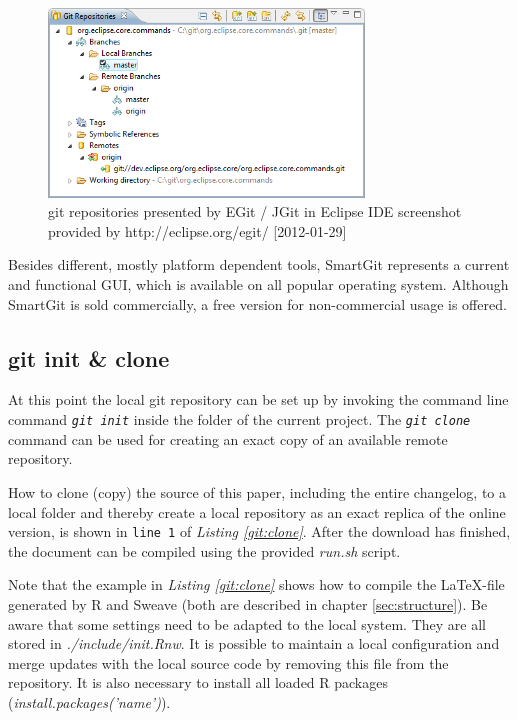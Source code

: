 \documentclass{ifacconf}
\begin{document}
\begin{figure}[h]
\begin{center}
\includegraphics[width=8.4cm]{pics/EGit.png}    %
\caption{git repositories presented by EGit / JGit in Eclipse IDE \newline 
screenshot provided by http://eclipse.org/egit/ [2012-01-29]} 
\label{fig:JGit}
\end{center}
\end{figure}

Besides different, mostly platform dependent tools, 
SmartGit represents a current and functional GUI, which
is available on all popular operating system. Although SmartGit is sold commercially,
a free version for non-commercial usage is offered.




\subsection{git init \& clone}
At this point the local git repository can be set up by invoking the
command line command \textit{\lstinline!git init!} inside
the folder of the current project. The \textit{\lstinline!git clone!} 
command can be used for creating an exact copy of an available remote repository.

How to clone (copy) the source of this paper, including the entire changelog, to a local folder 
and thereby create a local repository as an exact replica of the online version,
is shown in \verb|line 1| of \textit{Listing \ref{git:clone}}. After the download has
finished, the document can be compiled using the provided \textit{run.sh} script. 

Note that the example in \textit{Listing \ref{git:clone}} shows how to compile 
the \LaTeX-file generated by R and Sweave (both are described in chapter \ref{sec:structure}).
Be aware that some settings need to be adapted to the local system. They are all stored
in \textit{./include/init.Rnw}. It is possible to maintain a local configuration and 
merge updates with the local source code by removing this file from the repository.
It is also necessary to install all loaded R packages (\textit{install.packages('name')}).
\end{document}
